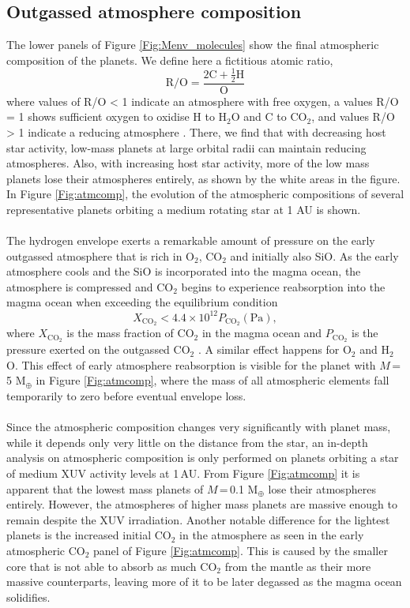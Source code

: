 \documentclass[bibyear,tradiabstract]{aa}
\begin{document}
\subsection{Outgassed atmosphere composition}
The lower panels of Figure \ref{Fig:Menv_molecules} show the final atmospheric composition of the planets. We define here a fictitious atomic ratio,
\begin{equation}\label{eq:RO}
    \mathrm{R}/\mathrm{O}=\frac{2\mathrm{C}+\frac{1}{2}\mathrm{H}}{\mathrm{O}}
\end{equation}
where values of R/O < 1 indicate an atmosphere with free oxygen, a values R/O = 1 shows sufficient oxygen to oxidise H to H$_2$O and C to CO$_2$, and values R/O > 1 indicate a reducing atmosphere \citep{Johansen+2024}. There, we find that with decreasing host star activity, low-mass planets at large orbital radii can maintain reducing atmospheres. Also, with increasing host star activity, more of the low mass planets lose their atmospheres entirely, as shown by the white areas in the figure. In Figure \ref{Fig:atmcomp}, the evolution of the atmospheric compositions of several representative planets orbiting a medium rotating star at 1 AU is shown.\\
\\
The hydrogen envelope exerts a remarkable amount of pressure on the early outgassed atmosphere that is rich in O$_2$, CO$_2$ and initially also SiO. As the early atmosphere cools and the SiO is incorporated into the magma ocean, the atmosphere is compressed and CO$_2$ begins to experience reabsorption into the magma ocean when exceeding the equilibrium condition
\begin{equation}
    X_{\mathrm{CO}_2}<
    4.4\times10^{12}P_{\mathrm{CO}_2}(\mathrm{Pa}),
\end{equation}
where $X_{\mathrm{CO}_2}$ is the mass fraction of CO$_2$ in the magma ocean and $P_{\mathrm{CO}_2}$ is the pressure exerted on the outgassed CO$_2$ \citep{Hirschmann+2012}. A similar effect happens for O$_2$ and H$_2$O. This effect of early atmosphere reabsorption is visible for the planet with $M$\,=\,5 M$_{\oplus}$ in Figure \ref{Fig:atmcomp}, where the mass of all atmospheric elements fall temporarily to zero before eventual envelope loss.
\\
\\
Since the atmospheric composition changes very significantly with planet mass, while it depends only very little on the distance from the star, an in-depth analysis on atmospheric composition is only performed on planets orbiting a star of medium XUV activity levels at 1\,AU. From Figure \ref{Fig:atmcomp} it is apparent that the lowest mass planets of $M$\,=\,0.1 M$_{\oplus}$ lose their atmospheres entirely. However, the atmospheres of higher mass planets are massive enough to remain despite the XUV irradiation. Another notable difference for the lightest planets is the increased initial CO$_2$ in the atmosphere {as seen in the early atmospheric CO$_2$ panel of Figure \ref{Fig:atmcomp}}. This is caused by the smaller core that is not able to absorb as much CO$_2$ from the mantle as their more massive counterparts, leaving more of it to be later degassed as the magma ocean solidifies.\\
\end{document}
